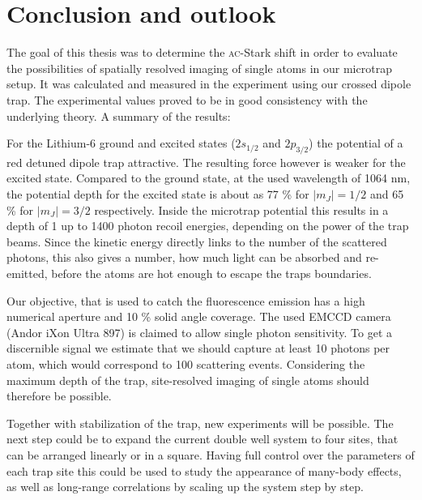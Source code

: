 \chapter{Conclusion and outlook}

The goal of this thesis was to determine the \textsc{ac}-Stark shift in order to evaluate the possibilities of spatially resolved imaging of single atoms in our microtrap setup. It was calculated and measured in the experiment using our crossed dipole trap. The experimental values proved to be in good consistency with the underlying theory. A summary of the results:

For the Lithium-6 ground and excited states ($2s_{1/2}$ and $2p_{3/2}$) the potential of a red detuned dipole trap attractive. The resulting force however is weaker for the excited state. Compared to the ground state, at the used wavelength of 1064 nm, the potential depth for the excited state is  about as 77 \% for $|m_J|=1/2$ and 65 \% for $|m_J|=3/2$ respectively. Inside the microtrap potential this results in a depth of 1 up to 1400 photon recoil energies, depending on the power of the trap beams. Since the kinetic energy directly links to the number of the scattered photons, this also gives a number, how much light can be absorbed and re-emitted, before the atoms are hot enough to escape the traps boundaries. 

Our objective, that is used to catch the fluorescence emission has a high numerical aperture and 10 \% solid angle coverage. The used EMCCD camera (Andor iXon Ultra 897) is claimed to allow single photon sensitivity. To get a discernible signal we estimate that we should capture at least 10 photons per atom, which would correspond to 100 scattering events. Considering the maximum depth of the trap, site-resolved imaging of single atoms should therefore be possible.

Together with stabilization of the trap, new experiments will be possible. The next step could be to expand the current double well system to four sites, that can be arranged linearly or in a square. Having full control over the parameters of each trap site this could be used to study the appearance of many-body effects, as well as long-range correlations by scaling up the system step by step. 





%
